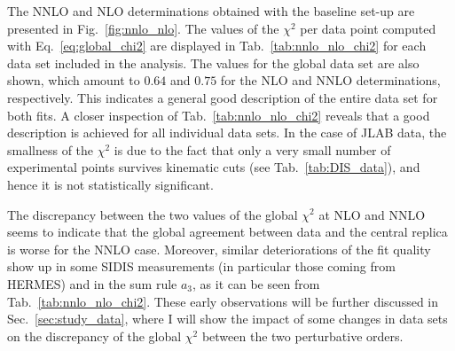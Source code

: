 The NNLO and NLO determinations obtained with the baseline set-up are presented in Fig.~\ref{fig:nnlo_nlo}. The values of the $\chi^2$ per data point computed with Eq.~\eqref{eq:global_chi2} are displayed in Tab.~\ref{tab:nnlo_nlo_chi2} for each data set included in the analysis. The values for the global data set are also shown, which amount to $0.64$ and $0.75$ for the NLO and NNLO determinations, respectively. This indicates a general good description of the entire data set for both fits. A closer inspection of Tab.~\ref{tab:nnlo_nlo_chi2} reveals that a good description is achieved for all individual data sets. In the case of JLAB data, the smallness of the $\chi^2$ is due to the fact that only a very small number of experimental points survives kinematic cuts (see Tab.~\ref{tab:DIS_data}), and hence it is not statistically significant.%

The discrepancy between the two values of the global $\chi^2$ at NLO and NNLO seems to indicate that the global agreement between data and the central replica is worse for the NNLO case. Moreover, similar deteriorations of the fit quality show up in some SIDIS measurements (in particular those coming from HERMES) and in the sum rule $a_3$, as it can be seen from Tab.~\ref{tab:nnlo_nlo_chi2}. These early observations will be further discussed in Sec.~\ref{sec:study_data}, where I will show the impact of some changes in data sets on the discrepancy of the global $\chi^2$ between the two perturbative orders.

  
